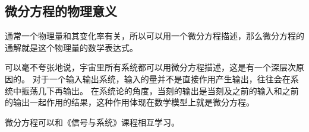 \subsection{微分方程的物理意义}

通常一个物理量和其变化率有关，所以可以用一个微分方程描述，那么微分方程的通解就是这个物理量的数学表达式。

可以毫不夸张地说，宇宙里所有系统都可以用微分方程描述，这是有一个深层次原因的。
对于一个输入输出系统，输入的量并不是直接作用产生输出，往往会在系统中振荡几下再输出。
在系统论的角度，当刻的输出是当刻及之前的输入和之前的输出一起作用的结果，这种作用体现在数学模型上就是微分方程。

\begin{tcolorbox}
微分方程可以和《信号与系统》课程相互学习。
\end{tcolorbox}




